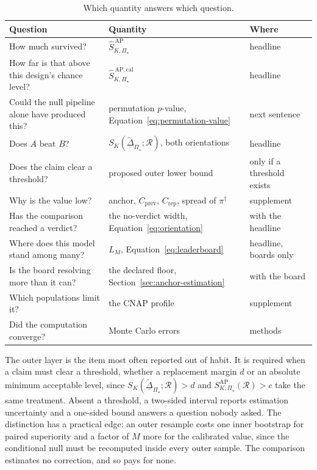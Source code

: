 \documentclass[11pt]{article}
\newcommand{\Regime}{\mathcal{R}}
\newcommand{\PSet}{\Pi_\star}
\newcommand{\SRob}{S_{K,\PSet}^{\mathrm{AP}}(\Regime)}
\newcommand{\SRobHat}{\widehat S_{K,\PSet}^{\,\mathrm{AP}}}
\newcommand{\SRobCalHat}{\widehat S_{K,\PSet}^{\,\mathrm{AP,cal}}}
\newcommand{\RobDta}{\underline{\widetilde{\Delta}}_{\PSet}}
\theoremstyle{remark}
\begin{document}
\begin{table}[ht]
\centering
\caption{Which quantity answers which question.}
\label{tab:reporting}
\begin{tabularx}{\textwidth}{@{}XXl@{}}
\toprule
Question & Quantity & Where \\
\midrule
How much survived? & $\SRobHat$ & headline \\
How far is that above this design's chance level? & $\SRobCalHat$ & headline \\
Could the null pipeline alone have produced this? & permutation $p$-value, Equation~\eqref{eq:permutation-value} & next sentence \\
Does $A$ beat $B$? & $S_K(\RobDta;\Regime)$, both orientations & headline \\
Does the claim clear a threshold? & proposed outer lower bound & only if a threshold exists \\
Why is the value low? & anchor, $C_{\mathrm{prev}}$, $C_{\mathrm{rep}}$, spread of $\pi^\dagger$ & supplement \\
Has the comparison reached a verdict? & the no-verdict width, Equation~\eqref{eq:orientation} & with the headline \\
Where does this model stand among many? & $L_M$, Equation~\eqref{eq:leaderboard} & headline, boards only \\
Is the board resolving more than it can? & the declared floor, Section~\ref{sec:anchor-estimation} & with the board \\
Which populations limit it? & the CNAP profile & supplement \\
Did the computation converge? & Monte Carlo errors & methods \\
\bottomrule
\end{tabularx}
\end{table}

The outer layer is the item most often reported out of habit. It is required when a claim must clear a threshold, whether a replacement margin $d$ or an absolute minimum acceptable level, since $S_K(\RobDta;\Regime)>d$ and $\SRob>c$ take the same treatment. Absent a threshold, a two-sided interval reports estimation uncertainty and a one-sided bound answers a question nobody asked. The distinction has a practical edge: an outer resample costs one inner bootstrap for paired superiority and a factor of $M$ more for the calibrated value, since the conditional null must be recomputed inside every outer sample. The comparison estimates no correction, and so pays for none.
\end{document}
